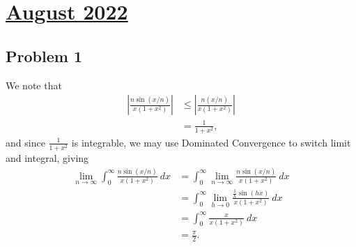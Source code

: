\documentclass[10pt]{mypackage}
\begin{document}
\section{\href{https://math.virginia.edu/graduate/exams/analysis/2022Aug_real.pdf}{August 2022}}%
\subsection{Problem 1}%
We note that
\begin{align*}
  \left\vert \frac{n\sin\left( x/n \right)}{x\left( 1+x^2 \right)}  \right\vert &\leq \left\vert \frac{n\left( x/n \right)}{x\left( 1+x^2 \right)} \right\vert\\
                                                                                &= \frac{1}{1+x^2},
\end{align*}
and since $\frac{1}{1+x^2}$ is integrable, we may use Dominated Convergence to switch limit and integral, giving
\begin{align*}
  \lim_{n\rightarrow\infty} \int_{0}^{\infty} \frac{n\sin\left( x/n \right)}{x\left( 1+x^2 \right)}\:dx &= \int_{0}^{\infty} \lim_{n\rightarrow\infty}\frac{n\sin\left( x/n \right)}{x\left( 1+x^2 \right)}\:dx\\
                                                                                                        &= \int_{0}^{\infty} \lim_{h\rightarrow 0} \frac{\frac{1}{h}\sin\left( hx \right)}{x\left( 1+x^2 \right)}\:dx\\
                                                                                                        &= \int_{0}^{\infty} \frac{x}{x\left( 1+x^2 \right)}\:dx\\
                                                                                                        &= \frac{\pi}{2}.
\end{align*}
\end{document}
